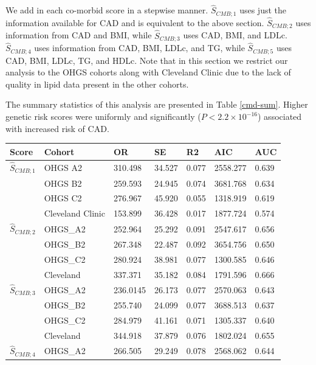 We add in each co-morbid score in a stepwise manner. $\hat{S}_{CMB; 1}$ uses just the information available for CAD and is equivalent to the above section.  $\hat{S}_{CMB; 2}$ uses information from CAD and BMI, while $\hat{S}_{CMB; 3}$ uses CAD, BMI, and LDLc. $\hat{S}_{CMB; 4}$ uses information from CAD, BMI, LDLc, and TG, while $\hat{S}_{CMB; 5}$ uses CAD, BMI, LDLc, TG, and HDLc. Note that in this section we restrict our analysis to the \ac{OHGS} cohorts along with Cleveland Clinic due to the lack of quality in lipid data present in the other cohorts. 

The summary statistics of this analysis are presented in Table \ref{cmd-sum}. Higher genetic risk scores were uniformly and significantly ($P < 2.2 \times 10^{-16}$) associated with increased risk of \ac{CAD}.

\begin{table}[H]
\centering
\begin{tabular}{lllllll}
\hline
Score & Cohort           & OR        & SE       & R2         & AIC      & AUC       \\ \hline
$\hat{S}_{CMB; 1}$     & OHGS A2          & 310.498 & 34.527 & 0.077 & 2558.277 & 0.639 \\
      & OHGS B2          & 259.593 & 24.945 & 0.074 & 3681.768 & 0.634 \\
      & OHGS C2          & 276.967 & 45.920 & 0.055 & 1318.919 & 0.619 \\
      & Cleveland Clinic & 153.899 & 36.428 & 0.017 & 1877.724 & 0.574 \\ \hline
$\hat{S}_{CMB; 2}$     & OHGS\_A2         & 252.964  & 25.292 & 0.091 & 2547.617 & 0.656 \\
      & OHGS\_B2         & 267.348   & 22.487 & 0.092 & 3654.756 & 0.650 \\
      & OHGS\_C2         & 280.924  & 38.981 & 0.077 & 1300.585 & 0.646 \\
      & Cleveland        & 337.371  & 35.182 & 0.084 & 1791.596 & 0.666 \\ \hline
$\hat{S}_{CMB; 3}$     & OHGS\_A2         & 236.0145  & 26.173 & 0.077 & 2570.063 & 0.643 \\
      & OHGS\_B2         & 255.740  & 24.099 & 0.077  & 3688.513 & 0.637 \\
      & OHGS\_C2         & 284.979  & 41.161 & 0.071 & 1305.337 & 0.640  \\
      & Cleveland        & 344.918  & 37.879 & 0.076 & 1802.024 & 0.655 \\ \hline
$\hat{S}_{CMB; 4}$     & OHGS\_A2         & 266.505  & 29.249 & 0.078 & 2568.062 & 0.644 \\

\end{tabular}
\end{table}
